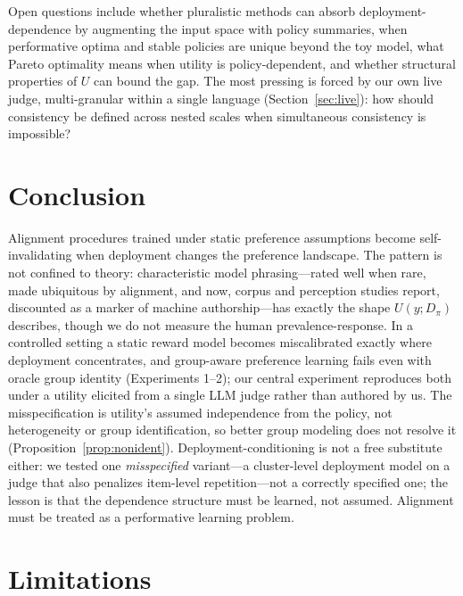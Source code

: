 ﻿\documentclass[11pt]{article}
\begin{document}
Open questions include whether pluralistic methods can absorb deployment-dependence by augmenting the input space with policy summaries, when performative optima and stable policies are unique beyond the toy model, what Pareto optimality means when utility is policy-dependent, and whether structural properties of \(U\) can bound the gap. The most pressing is forced by our own live judge, multi-granular within a single language (Section~\ref{sec:live}): how should consistency be defined across nested scales when simultaneous consistency is impossible?


\section{Conclusion}

Alignment procedures trained under static preference assumptions become self-invalidating when deployment changes the preference landscape. The pattern is not confined to theory: characteristic model phrasing---rated well when rare, made ubiquitous by alignment, and now, corpus and perception studies report, discounted as a marker of machine authorship---has exactly the shape \(U(y; D_\pi)\) describes, though we do not measure the human prevalence-response. In a controlled setting a static reward model becomes miscalibrated exactly where deployment concentrates, and group-aware preference learning fails even with oracle group identity (Experiments 1--2); our central experiment reproduces both under a utility elicited from a single LLM judge rather than authored by us. The misspecification is utility's assumed independence from the policy, not heterogeneity or group identification, so better group modeling does not resolve it (Proposition~\ref{prop:nonident}). Deployment-conditioning is not a free substitute either: we tested one \emph{misspecified} variant---a cluster-level deployment model on a judge that also penalizes item-level repetition---not a correctly specified one; the lesson is that the dependence structure must be learned, not assumed. Alignment must be treated as a performative learning problem.


\section*{Limitations}
\end{document}
